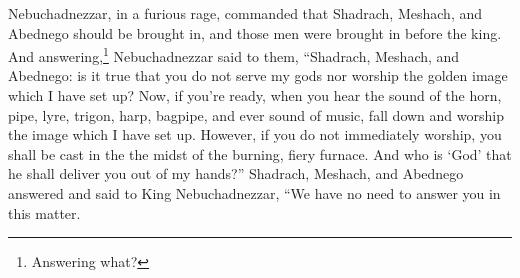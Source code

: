 

\begin{enumerate*}[mode=unboxed]
     Nebuchadnezzar, in a furious rage, commanded that Shadrach, Meshach, and Abednego should be brought in, and those men were brought in before the king.%
     And answering,\footnote{Answering what?} Nebuchadnezzar said to them, ``Shadrach, Meshach, and Abednego: is it true that you do not serve my gods nor worship the golden image which I have set up?%
     Now, if you're ready, when you hear the sound of the horn, pipe, lyre, trigon, harp, bagpipe, and ever sound of music, fall down and worship the image which I have set up. However, if you do not immediately worship, you shall be cast in the the midst of the burning, fiery furnace. And who is `God' that he shall deliver you out of my hands?''%
     Shadrach, Meshach, and Abednego answered and said to King Nebuchadnezzar, ``We have no need to answer you in this matter.%
\end{enumerate*}
